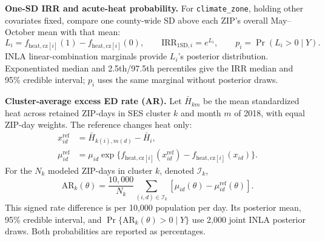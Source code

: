 \documentclass[10pt]{article}
\begin{document}
\textbf{One-SD IRR and acute-heat probability.}
For \texttt{climate\_zone}, holding other covariates fixed, compare one county-wide SD above each ZIP's
overall May--October mean with that mean:
\[
 L_i=f_{\mathrm{heat},\mathrm{cz}[i]}(1)-f_{\mathrm{heat},\mathrm{cz}[i]}(0),\qquad
 \mathrm{IRR}_{1\mathrm{SD},i}=e^{L_i},\qquad
 p_i=\Pr(L_i>0\mid Y).
\]
INLA linear-combination marginals provide $L_i$'s posterior distribution.
Exponentiated median and 2.5th/97.5th percentiles give the IRR median and
95\% credible interval; $p_i$ uses the same marginal without posterior draws.

\textbf{Cluster-average excess ED rate (AR).}
Let $\bar H_{km}$ be the mean standardized heat across retained ZIP-days in
SES cluster $k$ and month $m$ of 2018, with equal ZIP-day weights.
The reference changes heat only:
\begin{align*}
 x^{\mathrm{ref}}_{id}&=\bar H_{k(i),m(d)}-\bar H_i,\\
 \mu^{\mathrm{ref}}_{id}&=\mu_{id}
 \exp\{f_{\mathrm{heat},\mathrm{cz}[i]}(x^{\mathrm{ref}}_{id})-f_{\mathrm{heat},\mathrm{cz}[i]}(x_{id})\}.
\end{align*}
For the $N_k$ modeled ZIP-days in cluster $k$, denoted $\mathcal I_k$,
\[
 \mathrm{AR}_k(\theta)=\frac{10{,}000}{N_k}
 \sum_{(i,d)\in\mathcal I_k}
 [\mu_{id}(\theta)-\mu^{\mathrm{ref}}_{id}(\theta)].
\]
This signed rate difference is per 10,000 population per day.
Its posterior mean, 95\% credible interval, and
$\Pr\{\mathrm{AR}_k(\theta)>0\mid Y\}$ use 2,000 joint INLA posterior draws.
Both probabilities are reported as percentages.
\end{document}
